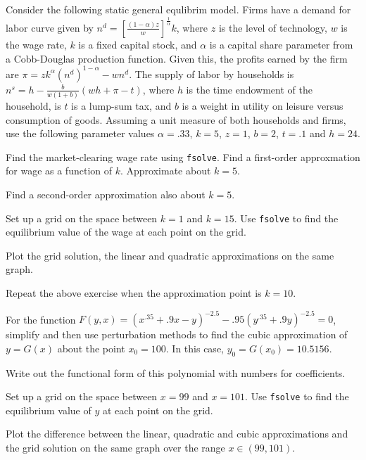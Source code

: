 \documentclass[letterpaper,11pt]{article}
\theoremstyle{definition}
\begin{document}
\begin{spacing}{1.5}
	\begin{Exercise} \label{Perturb_HW02_GEApprox}
		Consider the following static general equlibrim model.  Firms have a demand for labor curve given by $n^d = \left[\frac{(1-\alpha)z}{w}\right]^{\tfrac{1}{\alpha}} k$, where $z$ is the level of technology, $w$ is the wage rate, $k$ is a fixed capital stock, and $\alpha$ is a capital share parameter from a Cobb-Douglas production function.  Given this, the profits earned by the firm are $\pi = zk^\alpha (n^d)^{1-\alpha} - w n^d$.  The supply of labor by households is $n^s = h - \frac{b}{w(1+b)}(wh+\pi-t)$, where $h$ is the time endowment of the household, is $t$ is a lump-sum tax, and $b$ is a weight in utility on leisure versus consumption of goods.  Assuming a unit measure of both households and firms, use the following parameter values $\alpha = .33$, $k=5$, $z=1$, $b=2$, $t=.1$ and $h=24$.

		Find the market-clearing wage rate using {\tt fsolve}.  Find a first-order approxmation for wage as a function of $k$.  Approximate about $k=5$.

		Find a second-order approximation also about $k=5$.

		Set up a grid on the space between $k=1$ and $k=15$. Use {\tt fsolve} to find the equilibrium value of the wage at each point on the grid.

		Plot the grid solution, the linear and quadratic approximations on the same graph.

		Repeat the above exercise when the approximation point is $k=10$.
	\end{Exercise}

	\begin{Exercise} \label{Perturb_HW_Bivar_Grid}
		For the function $F(y,x) =(x^{.35} + .9x - y)^{-2.5} - .95(y^{.35} + .9y )^{-2.5} = 0$, simplify and then use perturbation methods to find the cubic approximation of $y=G(x)$ about the point $x_0=100$.  In this case, $y_0=G(x_0)=10.5156$.

		Write out the functional form of this polynomial with numbers for coefficients.

		Set up a grid on the space between $x=99$ and $x=101$. Use {\tt fsolve} to find the equilibrium value of $y$ at each point on the grid.

		Plot the difference between the linear, quadratic and cubic approximations and the grid solution on the same graph over the range $x\in(99,101)$.
	\end{Exercise}


\end{spacing}
\end{document}
